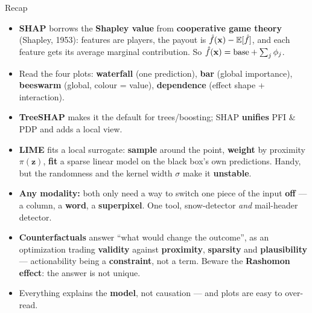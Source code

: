 \documentclass[aspectratio=169]{beamer}
\newcommand{\zv}{\mathbf{z}}
\begin{document}
\begin{frame}{Recap}
  \begin{itemize}\small
    \item \textbf{SHAP} borrows the \textbf{Shapley value} from \textbf{cooperative game theory}
      (Shapley, 1953): features are players, the payout is $\hat f(\mathbf{x}) - \mathbb{E}[\hat f]$, and
      each feature gets its average marginal contribution. So
      $\hat f(\mathbf{x}) = \text{base} + \sum_j \phi_j$.
    \item Read the four plots: \textbf{waterfall} (one prediction), \textbf{bar} (global importance),
      \textbf{beeswarm} (global, colour = value), \textbf{dependence} (effect shape + interaction).
    \item \textbf{TreeSHAP} makes it the default for trees/boosting; SHAP \textbf{unifies} PFI \& PDP
      and adds a local view.
    \item \textbf{LIME} fits a local surrogate: \textbf{sample} around the point, \textbf{weight}
      by proximity $\pi(\zv)$, \textbf{fit} a sparse linear model on the black box's own
      predictions. Handy, but the randomness and the kernel width $\sigma$ make it \textbf{unstable}.
    \item \textbf{Any modality:} both only need a way to switch one piece of the input
      \textbf{off} --- a column, a \textbf{word}, a \textbf{superpixel}. One tool, snow-detector
      \emph{and} mail-header detector.
    \item \textbf{Counterfactuals} answer ``what would change the outcome'', as an optimization
      trading \textbf{validity} against \textbf{proximity}, \textbf{sparsity} and
      \textbf{plausibility} --- actionability being a \textbf{constraint}, not a term. Beware the
      \textbf{Rashomon effect}: the answer is not unique.
    \item Everything explains the \textbf{model}, not causation --- and plots are easy to over-read.
  \end{itemize}
  \vfill
\end{frame}
\end{document}
